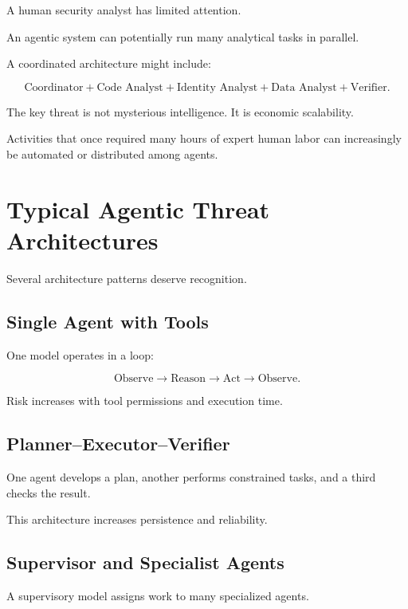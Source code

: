 A human security analyst has limited attention.

An agentic system can potentially run many analytical tasks in parallel.

A coordinated architecture might include:

\begin{equation}
\text{Coordinator}
+
\text{Code Analyst}
+
\text{Identity Analyst}
+
\text{Data Analyst}
+
\text{Verifier}.
\end{equation}

The key threat is not mysterious intelligence. It is economic scalability.

Activities that once required many hours of expert human labor can increasingly be automated or distributed among agents.

\section{Typical Agentic Threat Architectures}

Several architecture patterns deserve recognition.

\subsection{Single Agent with Tools}

One model operates in a loop:

\begin{equation}
\text{Observe}
\rightarrow
\text{Reason}
\rightarrow
\text{Act}
\rightarrow
\text{Observe}.
\end{equation}

Risk increases with tool permissions and execution time.

\subsection{Planner--Executor--Verifier}

One agent develops a plan, another performs constrained tasks, and a third checks the result.

This architecture increases persistence and reliability.

\subsection{Supervisor and Specialist Agents}

A supervisory model assigns work to many specialized agents.

